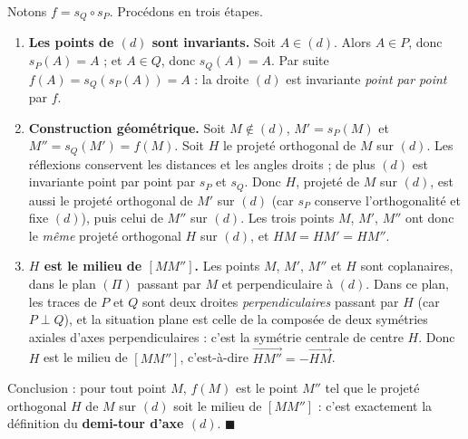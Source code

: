\documentclass[11pt]{article}
\begin{document}
\begin{experience}
Notons $f = s_Q \circ s_P$. Procédons en trois étapes.
\begin{enumerate}
\item \textbf{Les points de $(d)$ sont invariants.} Soit $A \in (d)$. Alors $A \in P$, donc $s_P(A) = A$ ; et $A \in Q$, donc $s_Q(A) = A$. Par suite $f(A) = s_Q(s_P(A)) = A$ : la droite $(d)$ est invariante \emph{point par point} par $f$.
\item \textbf{Construction géométrique.} Soit $M \notin (d)$, $M' = s_P(M)$ et $M'' = s_Q(M') = f(M)$. Soit $H$ le projeté orthogonal de $M$ sur $(d)$. Les réflexions conservent les distances et les angles droits ; de plus $(d)$ est invariante point par point par $s_P$ et $s_Q$. Donc $H$, projeté de $M$ sur $(d)$, est aussi le projeté orthogonal de $M'$ sur $(d)$ (car $s_P$ conserve l'orthogonalité et fixe $(d)$), puis celui de $M''$ sur $(d)$. Les trois points $M$, $M'$, $M''$ ont donc le \emph{même} projeté orthogonal $H$ sur $(d)$, et $HM = HM' = HM''$.
\item \textbf{$H$ est le milieu de $[MM'']$.} Les points $M$, $M'$, $M''$ et $H$ sont coplanaires, dans le plan $(\Pi)$ passant par $M$ et perpendiculaire à $(d)$. Dans ce plan, les traces de $P$ et $Q$ sont deux droites \emph{perpendiculaires} passant par $H$ (car $P \perp Q$), et la situation plane est celle de la composée de deux symétries axiales d'axes perpendiculaires : c'est la symétrie centrale de centre $H$. Donc $H$ est le milieu de $[MM'']$, c'est-à-dire $\overrightarrow{HM''} = -\overrightarrow{HM}$.
\end{enumerate}
Conclusion : pour tout point $M$, $f(M)$ est le point $M''$ tel que le projeté orthogonal $H$ de $M$ sur $(d)$ soit le milieu de $[MM'']$ : c'est exactement la définition du \textbf{demi-tour d'axe $(d)$}. \hfill$\blacksquare$
\end{experience}
\end{document}
